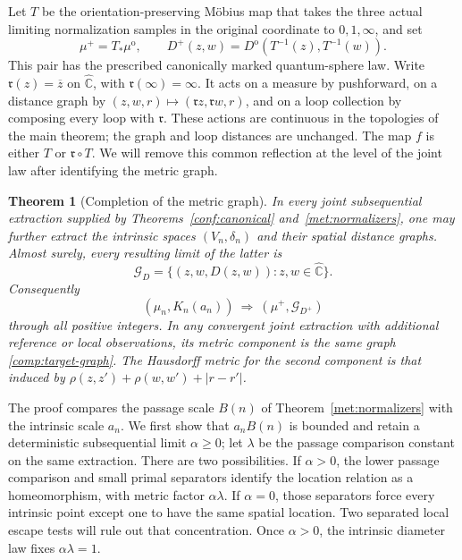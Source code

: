 \documentclass[11pt]{article}
\numberwithin{equation}{section}
\newtheorem{theorem}{Theorem}[section]
\theoremstyle{definition}
\theoremstyle{remark}
\newcommand{\1}{\mathbf 1}
\begin{document}
Let $T$ be the orientation-preserving M\"obius map that takes the
three actual limiting normalization samples in the original coordinate
to $0,1,\infty$, and set
\[
 \mu^+=T_*\mu^{\mathrm o},\qquad
 D^+(z,w)=D^{\mathrm o}(T^{-1}(z),T^{-1}(w)).
\]
This pair has the prescribed canonically marked quantum-sphere law.
Write $\mathfrak r(z)=\overline z$ on $\widehat{\mathbb C}$, with
$\mathfrak r(\infty)=\infty$.  It acts on a measure by pushforward,
on a distance graph by
$(z,w,r)\mapsto(\mathfrak r z,\mathfrak r w,r)$, and on a loop
collection by composing every loop with $\mathfrak r$.  These actions
are continuous in the topologies of the main theorem; the graph and
loop distances are unchanged.  The map $f$ is either $T$ or
$\mathfrak r\circ T$.  We will remove this common reflection at
the level of the joint law after identifying the metric graph.

\begin{theorem}[Completion of the metric graph]
\label{comp:metric-graph}
In every joint subsequential extraction supplied by
Theorems~\ref{conf:canonical} and~\ref{met:normalizers}, one may further
extract the intrinsic spaces $(V_n,\delta_n)$ and their spatial distance
graphs.  Almost surely, every resulting limit of the latter is
\begin{equation}
 \label{comp:target-graph}
 \mathcal G_D
   =\{(z,w,D(z,w)):z,w\in\widehat{\mathbb C}\}.
\end{equation}
Consequently
\[
 (\mu_n,K_n(a_n))\ \Longrightarrow\ (\mu^+,\mathcal G_{D^+})
\]
through all positive integers.  In any convergent joint extraction
with additional reference or local observations, its metric
component is the same graph \eqref{comp:target-graph}.  The
Hausdorff metric for the second component is that induced by
$\rho(z,z')+\rho(w,w')+|r-r'|$.
\end{theorem}

The proof compares the passage scale $B(n)$ of
Theorem~\ref{met:normalizers} with the intrinsic scale $a_n$.
We first show that $a_nB(n)$ is bounded and retain a deterministic
subsequential limit $\alpha\geq0$; let $\lambda$ be the passage
comparison constant on the same extraction.  There are two possibilities.
If $\alpha>0$, the lower passage comparison and small primal
separators identify the location relation as a homeomorphism, with
metric factor $\alpha\lambda$.  If $\alpha=0$, those separators
force every intrinsic point except one to have the same spatial
location.  Two separated local escape tests will rule out that
concentration.  Once $\alpha>0$, the intrinsic diameter law fixes
$\alpha\lambda=1$.
\end{document}
